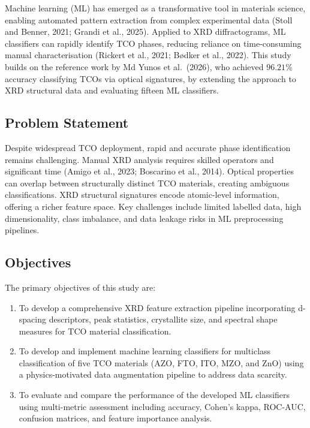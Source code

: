\documentclass[12pt, oneside]{article} %
\begin{document}
Machine learning (ML) has emerged as a transformative tool in materials science, enabling automated pattern extraction from complex experimental data (Stoll and Benner, 2021; Grandi et al., 2025). Applied to XRD diffractograms, ML classifiers can rapidly identify TCO phases, reducing reliance on time-consuming manual characterisation (Rickert et al., 2021; B{\o}dker et al., 2022). This study builds on the reference work by Md Yunos et al.\ (2026), who achieved $96.21\%$ accuracy classifying TCOs via optical signatures, by extending the approach to XRD structural data and evaluating fifteen ML classifiers.


\subsection{Problem Statement}

Despite widespread TCO deployment, rapid and accurate phase identification remains challenging. Manual XRD analysis requires skilled operators and significant time (Amigo et al., 2023; Boscarino et al., 2014). Optical properties can overlap between structurally distinct TCO materials, creating ambiguous classifications. XRD structural signatures encode atomic-level information, offering a richer feature space. Key challenges include limited labelled data, high dimensionality, class imbalance, and data leakage risks in ML preprocessing pipelines.


\subsection{Objectives}

The primary objectives of this study are:
\vspace{-5mm}
\begin{enumerate}[itemsep=0mm]
\item To develop a comprehensive XRD feature extraction pipeline incorporating d-spacing descriptors, peak statistics, crystallite size, and spectral shape measures for TCO material classification.

\item To develop and implement machine learning classifiers for multiclass classification of five TCO materials (AZO, FTO, ITO, MZO, and ZnO) using a physics-motivated data augmentation pipeline to address data scarcity.

\item To evaluate and compare the performance of the developed ML classifiers using multi-metric assessment including accuracy, Cohen's kappa, ROC-AUC, confusion matrices, and feature importance analysis.
\end{enumerate}
\end{document}
